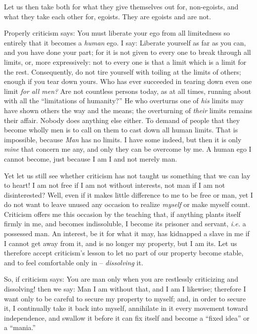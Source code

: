 \documentclass[12pt,a4paper]{book}
\begin{document}
Let us then take both for what they give themselves out for, non-egoists, and 
what they take each other for, egoists. They are egoists and are not.

Properly criticism says: You must liberate your ego from all limitedness so 
entirely that it becomes a \textit{human} ego. I say: Liberate yourself as far 
as you can, and you have done your part; for it is not given to every one to 
break through all limits, or, more expressively: not to every one is that a 
limit which is a limit for the rest. Consequently, do not tire yourself with 
toiling at the limits of others; enough if you tear down yours. Who has ever 
succeeded in tearing down even one limit \textit{for all men?} Are not 
countless persons today, as at all times, running about with all the 
``limitations of humanity?'' He who overturns one of \textit{his} limits may 
have shown others the way and the means; the overturning of \textit{their} 
limits remains their affair. Nobody does anything else either. To demand of 
people that they become wholly men is to call on them to cast down all human 
limits. That is impossible, because \textit{Man} has no limits. I have some 
indeed, but then it is only \textit{mine} that concern me any, and only they 
can be overcome by me. A human ego I cannot become, just because I am I and 
not merely man.

Yet let us still see whether criticism has not taught us something that we can 
lay to heart! I am not free if I am not without interests, not man if I am not 
disinterested? Well, even if it makes little difference to me to be free or 
man, yet I do not want to leave unused any occasion to realize \textit{myself} 
or make myself count. Criticism offers me this occasion by the teaching that, 
if anything plants itself firmly in me, and becomes indissoluble, I become its 
prisoner and servant, \textit{i.e.} a possessed man. An interest, be it for 
what it may, has kidnapped a slave in me if I cannot get away from it, and is 
no longer my property, but I am its. Let us therefore accept criticism's 
lesson to let no part of our property become stable, and to feel comfortable 
only in -- \textit{dissolving} it.

So, if criticism says: You are man only when you are restlessly criticizing 
and dissolving! then we say: Man I am without that, and I am I likewise; 
therefore I want only to be careful to secure my property to myself; and, in 
order to secure it, I continually take it back into myself, annihilate in it 
every movement toward independence, and swallow it before it can fix itself 
and become a ``fixed idea'' or a ``mania.''
\end{document}
